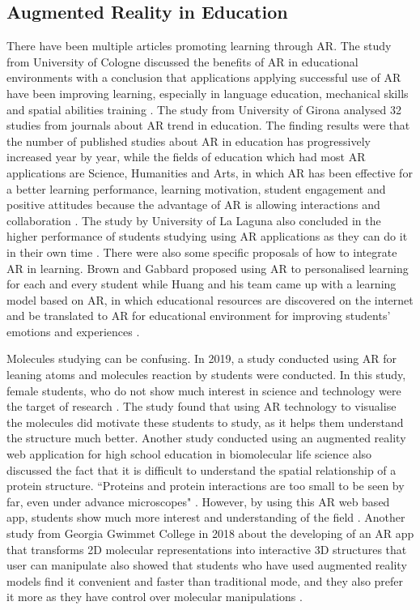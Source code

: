 \subsection{Augmented Reality in Education}
There have been multiple articles promoting learning through AR. The study from University of Cologne discussed the benefits of AR in educational environments with a conclusion that applications applying successful use of AR have been improving learning, especially in language education, mechanical skills and spatial abilities training \parencite{diegmann_benefits_2015}. The study from University of Girona analysed 32 studies from journals about AR trend in education. The finding results were that the number of published studies about AR in education has progressively increased year by year, while the fields of education which had most AR applications are Science, Humanities and Arts, in which AR has been effective for a better learning performance, learning motivation, student engagement and positive attitudes because the advantage of AR is allowing interactions and collaboration \parencite{bacca_augmented_2015}. The study by University of La Laguna also concluded in the higher performance of students studying using AR applications as they can do it in their own time \parencite{martin-gutierrez_augmented_2015}. There were also some specific proposals of how to integrate AR in learning. Brown and Gabbard proposed using AR to personalised learning for each and every student \parencite{brown_interactive_2015} while Huang and his team came up with a learning model based on AR, in which educational resources are discovered on the internet and be translated to AR for educational environment for improving students' emotions and experiences \parencite{huang_animating_2016}.

Molecules studying can be confusing. In 2019, a study conducted using AR for leaning atoms and molecules reaction by students were conducted. In this study, female students, who do not show much interest in science and technology were the target of research \parencite{ewais_usability_2019}. The study found that using AR technology to visualise the molecules did motivate these students to study, as it helps them understand the structure much better. 
Another study conducted using an augmented reality web application for high school education in biomolecular life  science also discussed the fact that it is difficult to understand the spatial relationship of a protein structure. ``Proteins and protein interactions are too small to be seen by far, even under advance microscopes" \parencite{nickels_proteinscanar_2012-1}. However, by using this AR web based app, students show much more interest and understanding of the field \parencite{nickels_proteinscanar_2012-1}.  Another study from Georgia Gwimmet College in 2018 about the developing of an AR app that transforms 2D molecular representations into interactive 3D structures that user can manipulate also showed that students who have used augmented reality models find it convenient and faster than traditional mode, and they also prefer it more as they have control over molecular manipulations \parencite{behmke_augmented_2018}.

